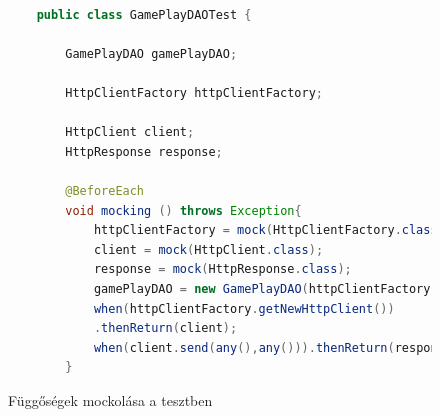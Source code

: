 \documentclass[a4paper,twoside]{article}
\begin{document}
\begin{figure}
	\caption{Függőségek mockolása a tesztben}
	\raggedleft
	\begin{lstlisting}[language=java]
		
	public class GamePlayDAOTest {
		
		GamePlayDAO gamePlayDAO;
		
		HttpClientFactory httpClientFactory;
		
		HttpClient client;
		HttpResponse response;
		
		@BeforeEach
		void mocking () throws Exception{
			httpClientFactory = mock(HttpClientFactory.class);
			client = mock(HttpClient.class);
			response = mock(HttpResponse.class);
			gamePlayDAO = new GamePlayDAO(httpClientFactory);
			when(httpClientFactory.getNewHttpClient())
			.thenReturn(client);
			when(client.send(any(),any())).thenReturn(response);
		}
	\end{lstlisting}
	\label{mocking}
\end{figure} 
\end{document}
